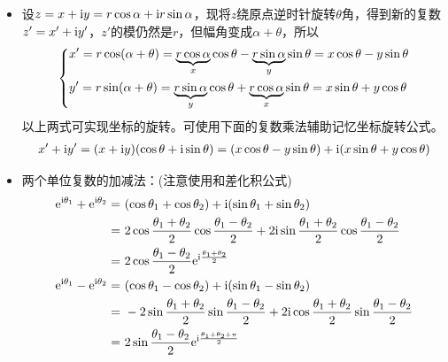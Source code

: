 \begin{itemize}[leftmargin=\inteval{\myitemleftmargin}pt,itemsep=
   \inteval{\myitemitempsep}pt,topsep=\inteval{\myitemtopsep}pt]
\item 设$ z=x+\mathrm{i} y=r\cos \alpha+\mathrm{i} r\sin \alpha $，现将$ z $绕原点逆时针旋转$ \theta $角，得到新的复数$ z'=x'+\mathrm{i} y' $，$ z' $的模仍然是$ r $，但幅角变成$ \alpha+\theta $，所以
\begin{gather}\label{坐标旋转公式}
\begin{dcases}
    x'=r\cos (\alpha+\theta)=\underbrace{r\cos\alpha}_{x}
    \cos\theta-	\underbrace{r\sin\alpha}_{y}\sin\theta	
    =x\cos\theta-y\sin\theta  \\
    y'=r\sin (\alpha+\theta)=\underbrace{r\sin\alpha}_{y}
    \cos\theta+\underbrace{r\cos\alpha}_{x}\sin\theta
    =x\sin\theta+y\cos\theta
\end{dcases} 
\end{gather}
以上两式可实现坐标的旋转。可使用下面的复数乘法辅助记忆坐标旋转公式。
\begin{gather*}
x'+\mathrm{i} y'=(x+\mathrm{i} y)(\cos\theta +\mathrm{i}\sin\theta)
=(x\cos\theta-y\sin\theta)+\mathrm{i}(x\sin\theta+y\cos\theta)
\end{gather*} 
\item 两个单位复数的加减法：(注意使用和差化积公式)
\begin{align*}
    \e^{\i\theta_1}+\e^{\i\theta_2}=&\ (\cos\theta_1+\cos\theta_2)+\i(\sin\theta_1+\sin\theta_2)\\
    =&\ 2\cos\dfrac{\theta_1+\theta_2}{2}\cos\dfrac{\theta_1-\theta_2}{2}+
    2\i\sin\dfrac{\theta_1+\theta_2}{2}\cos\dfrac{\theta_1-\theta_2}{2} \\
    =&\ 2\cos\dfrac{\theta_1-\theta_2}{2}\e^{\i\frac{\theta_1+\theta_2}{2}}  \\
    \e^{\i\theta_1}-\e^{\i\theta_2}=&\ (\cos\theta_1-\cos\theta_2)+\i(\sin\theta_1-\sin\theta_2)\\
    =&\ -2\sin\dfrac{\theta_1+\theta_2}{2}\sin\dfrac{\theta_1-\theta_2}{2}+
    2\i\cos\dfrac{\theta_1+\theta_2}{2}\sin\dfrac{\theta_1-\theta_2}{2} \\
    =&\ 2\sin\dfrac{\theta_1-\theta_2}{2}\e^{\i\frac{\theta_1+\theta_2+\pi}{2}}  
\end{align*}

\end{itemize}

